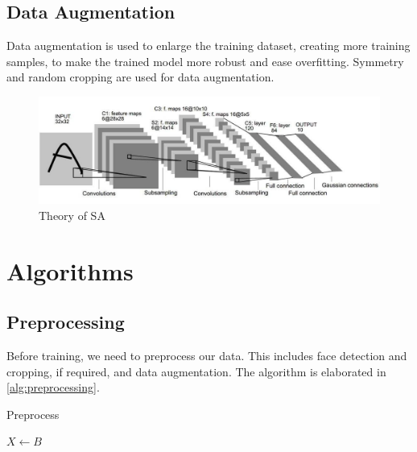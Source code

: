 \documentclass[conference]{IEEEtran}
\begin{document}
\subsection{Data Augmentation}
Data augmentation is used to enlarge the training dataset, creating more training samples, to make the trained model more robust and ease overfitting. Symmetry and random cropping are used for data augmentation.


\begin{figure}
  \centering
  \includegraphics[width=.45\textwidth]{LeNet_the.jpg}
  \caption{Theory of SA}
  \label{SA_theorem}
\end{figure}


\section{Algorithms}

\subsection{Preprocessing}
Before training, we need to preprocess our data. This includes face detection and cropping, if required, and data augmentation. The algorithm is elaborated in \ref{alg:preprocessing}.
        
\begin{algorithm}
    \BlankLine
    \caption{Preprocess}
    \label{alg:preprocessing}
        $X \leftarrow B$\;
        \;
\end{algorithm}
\end{document}
